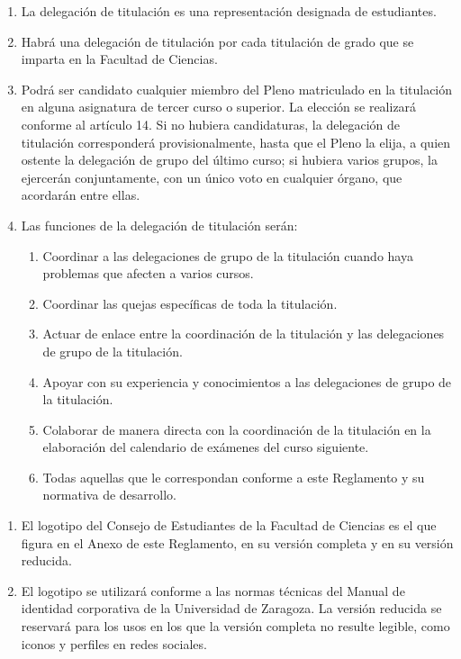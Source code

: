 \documentclass[11pt,a4paper]{article}
\begin{document}
\begin{enumerate}
\item La delegación de titulación es una representación designada de estudiantes.
\item Habrá una delegación de titulación por cada titulación de grado que se imparta en la Facultad de Ciencias.
\item Podrá ser candidato cualquier miembro del Pleno matriculado en la titulación en alguna asignatura de tercer curso o superior. La elección se realizará conforme al artículo 14. Si no hubiera candidaturas, la delegación de titulación corresponderá provisionalmente, hasta que el Pleno la elija, a quien ostente la delegación de grupo del último curso; si hubiera varios grupos, la ejercerán conjuntamente, con un único voto en cualquier órgano, que acordarán entre ellas.
\item Las funciones de la delegación de titulación serán:
  \begin{enumerate}
    \item Coordinar a las delegaciones de grupo de la titulación cuando haya problemas que afecten a varios cursos.
    \item Coordinar las quejas específicas de toda la titulación.
    \item Actuar de enlace entre la coordinación de la titulación y las delegaciones de grupo de la titulación.
    \item Apoyar con su experiencia y conocimientos a las delegaciones de grupo de la titulación.
    \item Colaborar de manera directa con la coordinación de la titulación en la elaboración del calendario de exámenes del curso siguiente.
    \item Todas aquellas que le correspondan conforme a este Reglamento y su normativa de desarrollo.
  \end{enumerate}
\end{enumerate}


\begin{enumerate}
\item El logotipo del Consejo de Estudiantes de la Facultad de Ciencias es el que figura en el Anexo de este Reglamento, en su versión completa y en su versión reducida.
\item El logotipo se utilizará conforme a las normas técnicas del Manual de identidad corporativa de la Universidad de Zaragoza. La versión reducida se reservará para los usos en los que la versión completa no resulte legible, como iconos y perfiles en redes sociales.
\end{enumerate}
\end{document}
